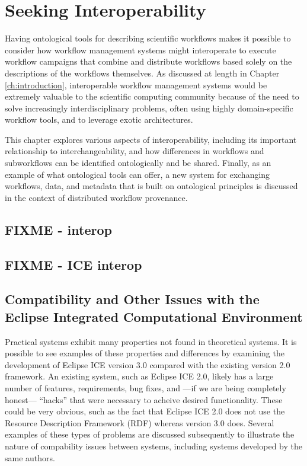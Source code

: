 \chapter{Seeking Interoperability} \label{ch:interoperability}

Having ontological tools for describing scientific workflows makes it possible
to consider how workflow management systems might interoperate to execute
workflow campaigns that combine and distribute workflows based solely on the
descriptions of the workflows themselves. As discussed at length in
Chapter \ref{ch:introduction}, interoperable workflow management systems would
be extremely valuable to the scientific computing community because of the need
to solve increasingly interdisciplinary problems, often using highly
domain-specific workflow tools, and to leverage exotic architectures.

This chapter explores various aspects of interoperability, including its
important relationship to interchangeability, and how differences in workflows
and subworkflows can be identified ontologically and be shared. Finally, as an
example of what ontological tools can offer, a new system for exchanging
workflows, data, and metadata that is built on ontological principles is
discussed in the context of distributed workflow provenance.

\section{FIXME - interop}

\section{FIXME - ICE interop}
\section{Compatibility and Other Issues with the Eclipse Integrated
Computational Environment}


Practical systems exhibit many properties not found in theoretical systems. It
is possible to see examples of these properties and differences by examining the
development of Eclipse ICE version 3.0 compared with the existing version 2.0
framework. An existing system, such as Eclipse ICE 2.0, likely has a large
number of features, requirements, bug fixes, and ---if we are being completely
honest--- ``hacks'' that were necessary to acheive desired functionality. These
could be very obvious, such as the fact that Eclipse ICE 2.0 does not use the Resource
Description Framework (RDF) whereas version 3.0 does. Several examples of these
types of problems are discussed subsequently to illustrate the nature of
compability issues between systems, including systems developed by the same authors.

